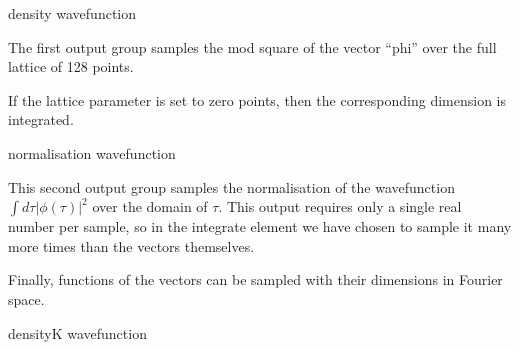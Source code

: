 \documentclass[letterpaper,10pt,english]{sphinxmanual}
\begin{document}
\begin{sphinxVerbatim}[commandchars=\\\{\}]
  
  density
  wavefunction
  \PYG{c+cp}{\PYGZlt{}![CDATA[}
      
  \PYG{c+cp}{]]\PYGZgt{}}
\end{sphinxVerbatim}

\sphinxAtStartPar
The first output group samples the mod square of the vector “phi” over the full lattice of 128 points.

\sphinxAtStartPar
If the lattice parameter is set to zero points, then the corresponding dimension is integrated.

\begin{sphinxVerbatim}[commandchars=\\\{\}]
  
  normalisation
  wavefunction
  \PYG{c+cp}{\PYGZlt{}![CDATA[}
      
  \PYG{c+cp}{]]\PYGZgt{}}
\end{sphinxVerbatim}

\sphinxAtStartPar
This second output group samples the normalisation of the wavefunction \(\int d\tau |\phi(\tau)|^2\) over the domain of \(\tau\).  This output requires only a single real number per sample, so in the integrate element we have chosen to sample it many more times than the vectors themselves.

\sphinxAtStartPar
Finally, functions of the vectors can be sampled with their dimensions in Fourier space.

\begin{sphinxVerbatim}[commandchars=\\\{\}]
  
  densityK
  wavefunction
  \PYG{c+cp}{\PYGZlt{}![CDATA[}
      
  \PYG{c+cp}{]]\PYGZgt{}}
\end{sphinxVerbatim}
\end{document}

